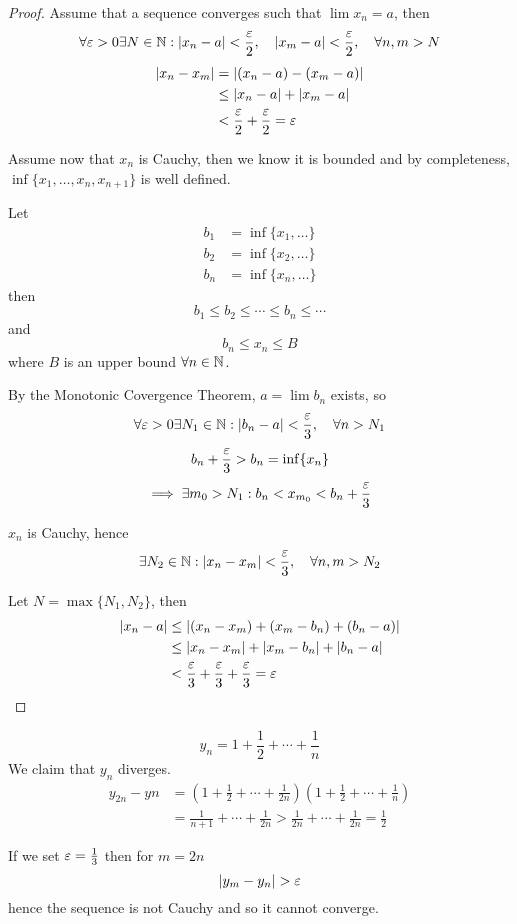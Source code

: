\documentclass[a4paper,10pt]{article}
\begin{document}
\begin{proof}
	Assume that a sequence converges such that $\lim x_n = a$, then
	\[
		\forall \varepsilon > 0 \exists N \in \mathbb{N} :
		| x_n - a | < \frac{\varepsilon}{2}, \quad
		| x_m - a | < \frac{\varepsilon}{2}, \quad
		\forall n,m > N
	\]
	\begin{align*}
		|x_n - x_m| &= |(x_n -a) - (x_m -a)| \\
			    &\leq |x_n -a| + |x_m -a| \\
			    &< \frac{\varepsilon}{2} + \frac{\varepsilon}{2} = \varepsilon
	\end{align*}

	Assume now that $x_n$ is Cauchy, then we know it is bounded and
	by completeness, $\inf\{x_1, \ldots, x_n, x_{n+1}\}$ is well
	defined.

	Let
	\begin{align*}
		b_1 &= \inf \{x_1, \ldots\} \\
		b_2 &= \inf \{x_2, \ldots\} \\
		b_n &= \inf \{x_n, \ldots\}
	\end{align*}
	then
	\[
		b_1 \leq b_2 \leq \cdots \leq b_n \leq \cdots
	\]
	and
	\[
		b_n \leq x_n \leq B
	\]
	where $B$ is an upper bound $\forall n \in \mathbb{N}$.

	By the Monotonic Covergence Theorem, $a = \lim b_n$ exists, so
	\[
		\forall \varepsilon > 0 \exists N_1 \in \mathbb{N} :
		|b_n - a| < \frac{\varepsilon}{3}, \quad \forall n > N_1
	\]
	\[
		b_n + \frac{\varepsilon}{3} > b_n = \inf\{x_n\}
	\]
	\[
		\implies \exists m_0 > N_1 :
		b_n < x_{m_0} < b_n + \frac{\varepsilon}{3}
	\]

	$x_n$ is Cauchy, hence
	\[
		\exists N_2 \in \mathbb{N} :
		|x_n - x_m| < \frac{\varepsilon}{3}, \quad
		\forall n,m > N_2
	\]

	Let $N = \max\{N_1, N_2\}$, then
	\begin{align*}
		|x_n - a| &\leq |(x_n - x_m) + (x_m - b_n) + (b_n - a)| \\
			  &\leq |x_n - x_m| + |x_m - b_n| + |b_n - a| \\
			  &< \frac{\varepsilon}{3} + \frac{\varepsilon}{3}
				+ \frac{\varepsilon}{3} = \varepsilon
	\end{align*}
\end{proof}

\begin{ex}
	\[
		y_n = 1 + \frac{1}{2} + \cdots + \frac{1}{n}
	\]
	We claim that $y_n$ diverges.
	\begin{align*}
		y_{2n} - y{n} &=
		\left(1 + \frac{1}{2} + \cdots + \frac{1}{2n} \right)
		\left(1 + \frac{1}{2} + \cdots + \frac{1}{n} \right) \\
		&= \frac{1}{n+1} + \cdots + \frac{1}{2n}
		> \frac{1}{2n} + \cdots + \frac{1}{2n} = \frac{1}{2}
	\end{align*}

	If we set $\varepsilon = \frac{1}{3}$ then for $m = 2n$
	\[
		|y_m - y_n| > \varepsilon
	\]
	hence the sequence is not Cauchy and so it cannot converge.
\end{ex}
\end{document}
